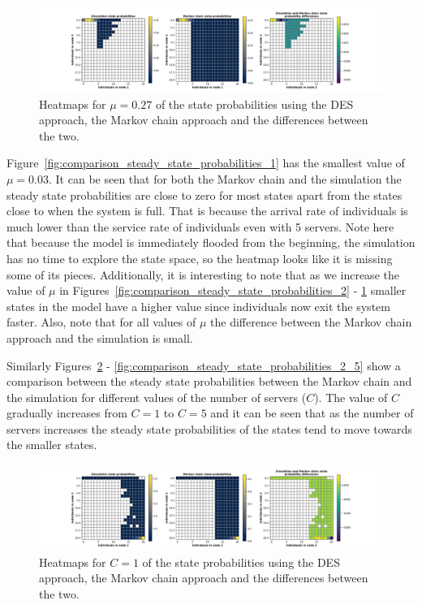 \begin{figure}[H]
    \includegraphics[width=\textwidth, trim=100 10 100 10, clip]{chapters/03_queueing_model/img/numeric_results_and_timings/steady_state_probabilities/main_9.pdf}
    \caption{Heatmaps for \(\mu = 0.27\) of the state probabilities using the
    DES approach, the Markov chain approach and the differences between the
    two.}
    \label{fig:comparison_steady_state_probabilities_5}
\end{figure}

Figure~\ref{fig:comparison_steady_state_probabilities_1} has the smallest
value of \(\mu = 0.03\).
It can be seen that for both the Markov chain and the simulation the steady
state probabilities are close to zero for most states apart from the
states close to when the system is full.
That is because the arrival rate of individuals is much lower than the service
rate of individuals even with 5 servers.
Note here that because the model is immediately flooded from the beginning, the
simulation has no time to explore the state space, so the heatmap looks like
it is missing some of its pieces.
Additionally, it is interesting to note that as we increase the value of \(\mu\)
in Figures~\ref{fig:comparison_steady_state_probabilities_2} -
\ref{fig:comparison_steady_state_probabilities_5} smaller states in the model
have a higher value since individuals now exit the system faster.
Also, note that for all values of \(\mu\) the difference between the Markov
chain approach and the simulation is small.

Similarly Figures~\ref{fig:comparison_steady_state_probabilities_2_1} -
\ref{fig:comparison_steady_state_probabilities_2_5} show a comparison between
the steady state probabilities between the Markov chain and the simulation
for different values of the number of servers (\(C\)).
The value of \(C\) gradually increases from \(C = 1\) to \(C = 5\) and it can
be seen that as the number of servers increases the steady state probabilities
of the states tend to move towards the smaller states.


\begin{figure}[H]
    \includegraphics[width=\textwidth, trim=100 10 100 10, clip]{chapters/03_queueing_model/img/numeric_results_and_timings/steady_state_probabilities_2/main_1.pdf}
    \caption{Heatmaps for \(C = 1\) of the state probabilities using the
    DES approach, the Markov chain approach and the differences between the
    two.}
    \label{fig:comparison_steady_state_probabilities_2_1}
\end{figure}

